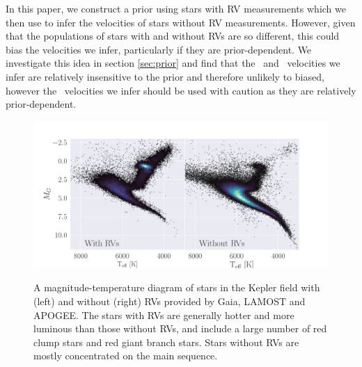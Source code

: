 In this paper, we construct a prior using stars with RV measurements which we
then use to infer the velocities of stars without RV measurements.
However, given that the populations of stars with and without RVs are so
different, this could bias the velocities we infer, particularly if they are
prior-dependent.
We investigate this idea in section \ref{sec:prior} and find that the \vx\ and
\vz\ velocities we infer are relatively insensitive to the prior and therefore
unlikely to biased, however the \vy\ velocities we infer should be used with
caution as they are relatively prior-dependent.
\begin{figure}[ht!]
\caption{
    A magnitude-temperature diagram of stars in the Kepler field with (left)
    and without (right) RVs provided by Gaia, LAMOST and APOGEE.
    The stars with RVs are generally hotter and more luminous than those
    without RVs, and include a large number of red clump stars and red giant
    branch stars.
    Stars without RVs are mostly concentrated on the main sequence.
}
  \centering \includegraphics[width=1\textwidth]{CMD}
\label{fig:CMD}
\end{figure}
